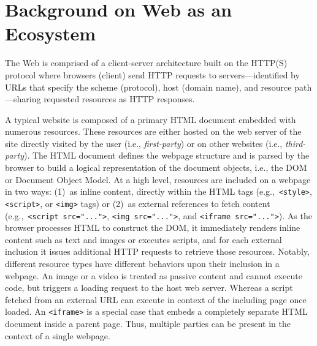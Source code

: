 \section{Background on Web as an Ecosystem}
\label{sec:background}

The Web is comprised of a client-server architecture built on the HTTP(S) protocol where browsers (client) send HTTP requests to servers---identified by URLs that specify the scheme (protocol), host (domain name), and resource path---sharing requested resources as HTTP responses.
%

%
A typical website is composed of a primary HTML document embedded with numerous resources. 
%
These resources are either hosted on the web server of the site directly visited by the user (i.e., \textit{first-party}) or on other websites (i.e., \textit{third-party}).
%
The HTML document defines the webpage structure and is parsed by the browser to build a logical representation of the document objects, i.e., the DOM or Document Object Model. 
%
At a high level, resources are included on a webpage in two ways: (1)~as inline content, directly within the HTML tags (e.g.,~\texttt{<style>}, \texttt{<script>}, or \texttt{<img>} tags) or (2)~as external references to fetch content (e.g.,~\texttt{<script src="...">}, \texttt{<img src="...">}, and \texttt{<iframe src="...">}). 
%
As the browser processes HTML to construct the DOM, it immediately renders inline content such as text and images or executes scripts, and for each external inclusion it issues additional HTTP requests to retrieve those resources. 
%
%
Notably, different resource types have different behaviors upon their inclusion in a webpage.
%
An image or a video is treated as passive content and cannot execute code, but triggers a loading request to the host web server.
%
Whereas a script fetched from an external URL can execute in context of the including page once loaded.
%
An \texttt{<iframe>} is a special case that embeds a completely separate HTML document inside a parent page.
%
Thus, multiple parties can be present in the context of a single webpage.


